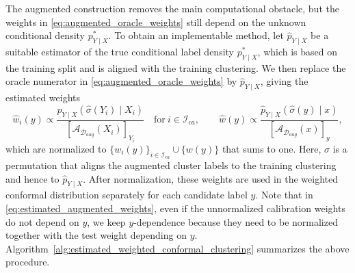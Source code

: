 \documentclass[11pt,letterpaper]{article}
\theoremstyle{definition}
\newcommand{\cD}{\mathcal{D}}
\newcommand{\cI}{\mathcal{I}}
\begin{document}
The augmented construction removes the main computational obstacle, but the weights in \eqref{eq:augmented_oracle_weights} still depend on the unknown conditional density \(p_{Y\mid X}^\ast\). To obtain an implementable method, let \(\hat p_{Y\mid X}\) be a suitable estimator of the true conditional label density $p_{Y \mid X}^\ast$, which is based on the training split and is aligned with the training clustering. We then replace the oracle numerator in \eqref{eq:augmented_oracle_weights} by \(\hat p_{Y\mid X}\), giving the estimated weights
\begin{equation}
    \label{eq:estimated_augmented_weights}
    \hat w_i(y)
    \propto
    \frac{\hat p_{Y\mid X}(\hat{\sigma}(Y_i)\mid X_i)}
    {\left[\mathcal A_{\cD_{aug}}(X_i)\right]_{Y_i}}
    \quad \text{for} ~ i \in \cI_{ca},
    \qquad
    \hat w(y)
    \propto
    \frac{\hat p_{Y\mid X}(\hat{\sigma}(y)\mid x)}
    {\left[\mathcal A_{\cD_{aug}}(x)\right]_y},
\end{equation}
which are normalized to \(\{w_i(y)\}_{i \in \cI_{ca}} \cup \{w(y)\}\) that sums to one. Here, $\hat{\sigma}$ is a permutation that aligns the augmented cluster labels to the training clustering and hence to $\hat{p}_{Y \mid X}$. After normalization, these weights are used in the weighted conformal distribution separately for each candidate label \(y\). Note that in \eqref{eq:estimated_augmented_weights}, even if the unnormalized calibration weights do not depend on \(y\), we keep $y$-dependence because they need to be normalized together with the test weight depending on \(y\). Algorithm~\ref{alg:estimated_weighted_conformal_clustering} summarizes the above procedure.
\end{document}
